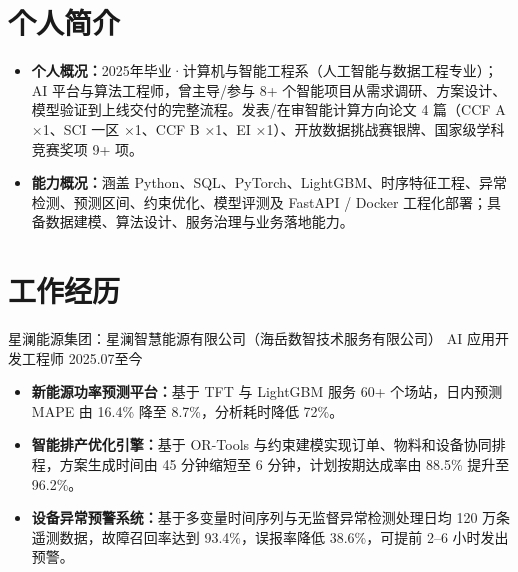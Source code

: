 \documentclass{claritycv}
\begin{document}

\section{个人简介}
\begin{itemize}
  \item \textbf{个人概况：}2025年毕业·计算机与智能工程系（人工智能与数据工程专业）；AI 平台与算法工程师，曾主导/参与 8+ 个智能项目从需求调研、方案设计、模型验证到上线交付的完整流程。发表/在审智能计算方向论文 4 篇（CCF A ×1、SCI 一区 ×1、CCF B ×1、EI ×1）、开放数据挑战赛银牌、国家级学科竞赛奖项 9+ 项。
  \item \textbf{能力概况：}涵盖 Python、SQL、PyTorch、LightGBM、时序特征工程、异常检测、预测区间、约束优化、模型评测及 FastAPI / Docker 工程化部署；具备数据建模、算法设计、服务治理与业务落地能力。
\end{itemize}

\section{工作经历}

\resumeentry
  {星澜能源集团：星澜智慧能源有限公司（海岳数智技术服务有限公司）}
  {AI 应用开发工程师}
  {2025.07}{至今}
\begin{itemize}
  \item \textbf{新能源功率预测平台：}基于 TFT 与 LightGBM 服务 60+ 个场站，日内预测 MAPE 由 16.4\% 降至 8.7\%，分析耗时降低 72\%。
  \item \textbf{智能排产优化引擎：}基于 OR-Tools 与约束建模实现订单、物料和设备协同排程，方案生成时间由 45 分钟缩短至 6 分钟，计划按期达成率由 88.5\% 提升至 96.2\%。
  \item \textbf{设备异常预警系统：}基于多变量时间序列与无监督异常检测处理日均 120 万条遥测数据，故障召回率达到 93.4\%，误报率降低 38.6\%，可提前 2--6 小时发出预警。
\end{itemize}
\end{document}

